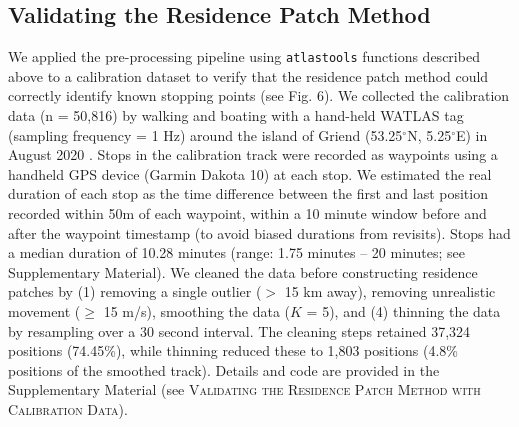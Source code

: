\documentclass[10pt,paper=a4,headings=standardclasses
]{scrartcl}
\begin{document}
\subsection{Validating the Residence Patch Method}

We applied the pre-processing pipeline using \texttt{atlastools} functions described above to a calibration dataset to verify that the residence patch method could correctly identify known stopping points (see Fig. 6).
We collected the calibration data (n = 50,816) by walking and boating with a hand-held WATLAS tag (sampling frequency = 1 Hz) around the island of Griend (53.25$^{\circ}$N, 5.25$^{\circ}$E) in August 2020 \citep[][; Bijleveld et al. \textit{in prep.}]{beardsworth2021}.
Stops in the calibration track were recorded as waypoints using a handheld GPS device (Garmin Dakota 10) at each stop.
We estimated the real duration of each stop as the time difference between the first and last position recorded within 50m of each waypoint, within a 10 minute window before and after the waypoint timestamp (to avoid biased durations from revisits).
Stops had a median duration of 10.28 minutes (range: 1.75 minutes -- 20 minutes; see Supplementary Material).
We cleaned the data before constructing residence patches by (1) removing a single outlier ($>$ 15 km away), removing unrealistic movement ($\geq$ 15 m/s), smoothing the data ($K$ = 5), and (4) thinning the data by resampling over a 30 second interval.
The cleaning steps retained 37,324 positions (74.45\%), while thinning reduced these to 1,803 positions (4.8\% positions of the smoothed track).
Details and code are provided in the Supplementary Material (see \textsc{Validating the Residence Patch Method with Calibration Data}).

\end{document}
